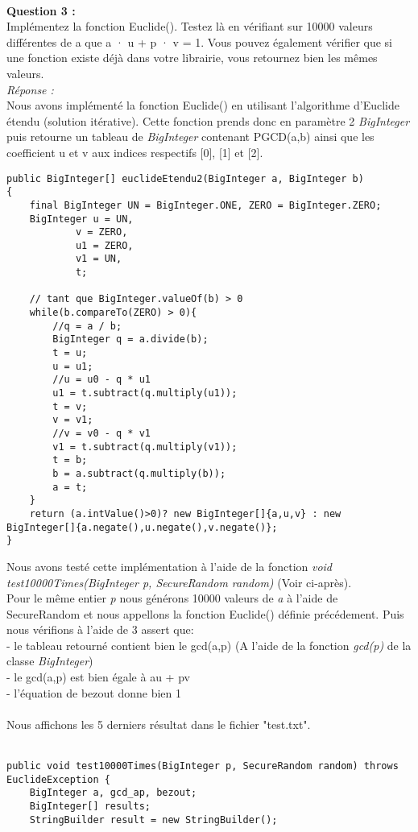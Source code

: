 \documentclass[a4paper,11pt]{article}
\begin{document}
    \textbf{\\Question 3 : \\}Implémentez la fonction Euclide(). Testez là en vérifiant sur 10000 valeurs différentes de a que a · u + p · v = 1. Vous pouvez également vérifier que si une fonction existe déjà dans votre librairie, vous retournez bien les mêmes valeurs.
    \textit{\\Réponse :} \\Nous avons implémenté la fonction Euclide() en utilisant l'algorithme d'Euclide étendu (solution itérative). Cette fonction prends donc en paramètre 2 \textit{BigInteger} puis retourne un tableau de \textit{BigInteger} contenant PGCD(a,b) ainsi que les coefficient u et v aux indices respectifs [0], [1] et [2].\\\begin{lstlisting}[caption ={Euclide étendu itératif}, captionpos=b,breaklines = true]
public BigInteger[] euclideEtendu2(BigInteger a, BigInteger b)
{
    final BigInteger UN = BigInteger.ONE, ZERO = BigInteger.ZERO;
    BigInteger u = UN,
            v = ZERO,
            u1 = ZERO,
            v1 = UN,
            t;

    // tant que BigInteger.valueOf(b) > 0
    while(b.compareTo(ZERO) > 0){
        //q = a / b;
        BigInteger q = a.divide(b);
        t = u;
        u = u1;
        //u = u0 - q * u1
        u1 = t.subtract(q.multiply(u1));
        t = v;
        v = v1;
        //v = v0 - q * v1
        v1 = t.subtract(q.multiply(v1));
        t = b;
        b = a.subtract(q.multiply(b));
        a = t;
    }
    return (a.intValue()>0)? new BigInteger[]{a,u,v} : new BigInteger[]{a.negate(),u.negate(),v.negate()};
}\end{lstlisting}Nous avons testé cette implémentation à l'aide de la fonction \textit{ void test10000Times(BigInteger p, SecureRandom random) } (Voir ci-après).\\Pour le même entier \textit{p} nous générons 10000 valeurs de \textit{a} à l'aide de SecureRandom et nous appellons la fonction Euclide() définie précédement. Puis nous vérifions à l'aide de 3 assert que:\\ - le tableau retourné contient bien le gcd(a,p) (A l'aide de la fonction \textit{gcd(p)} de la classe \textit{BigInteger})\\ - le gcd(a,p) est bien égale à au + pv\\ - l'équation de bezout donne bien 1\\\\ Nous affichons les 5 derniers résultat dans le fichier "test.txt". \\\\\begin{lstlisting}[caption ={testEuclide}, captionpos=b,breaklines = true]
public void test10000Times(BigInteger p, SecureRandom random) throws EuclideException {
    BigInteger a, gcd_ap, bezout;
    BigInteger[] results;
    StringBuilder result = new StringBuilder();


\end{lstlisting}
\end{document}
